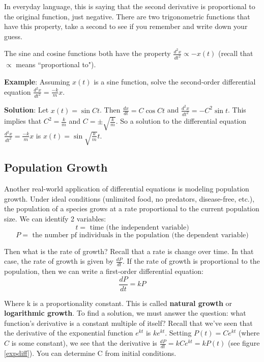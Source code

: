 In everyday language, this is saying that the second derivative is proportional 
to the original function, just negative. There are two trigonometric functions 
that have this property, take a second to see if you remember and write down 
your guess. 

The sine and cosine functions both have the property $\frac{d^2x}{dt^2} \propto 
-x(t)$ (recall that $\propto$ means ``proportional to"). 

\textbf{Example}: Assuming $x(t)$ is a sine function, solve the second-order 
differential equation $\frac{d^2x}{dt^2} = \frac{-k}{m}x$.

\textbf{Solution}: Let $x(t) = \sin{Ct}$. Then $\frac{dx}{dt} = C\cos{Ct}$ and 
$\frac{d^2x}{dt^2} = -C^2\sin{t}$. This implies that $C^2 = \frac{k}{m}$ and 
$C = \pm \sqrt{\frac{k}{m}}$. So a solution to the differential equation 
$\frac{d^2x}{dt^2} = \frac{-k}{m}x$ is $x(t) = \sin{\sqrt{\frac{k}{m}}t}$. 

\subsection{Population Growth}
Another real-world application of differential equations is modeling population 
growth. Under ideal conditions (unlimited food, no predators, disease-free, 
etc.), the population of a species grows at a rate proportional to the current 
population size. We can identify 2 variables:
$$t = \text{ time (the independent variable)}$$
$$P = \text{ the number pf individuals in the population (the dependent 
variable)}$$

Then what is the rate of growth? Recall that a rate is change over time. In 
that case, the rate of growth is given by $\frac{dP}{dt}$. If the rate of 
growth is proportional to the population, then we can write a first-order 
differential equation:
$$\frac{dP}{dt} = kP$$

Where k is a proportionality constant. This is called \textbf{natural growth} 
or \textbf{logarithmic growth}. 
To find a solution, we must answer the question: what function's derivative is 
a constant multiple of itself? Recall that we've seen that the derivative of 
the exponential function $e^{kt}$ is $ke^{kt}$. Setting $P(t) = Ce^{kt}$ 
(where $C$ is some constant), we see that the derivative is $\frac{dP}{dt} = 
kCe^{kt} = kP(t)$ (see figure \ref{expdiff}). You can determine C from initial 
conditions. 

